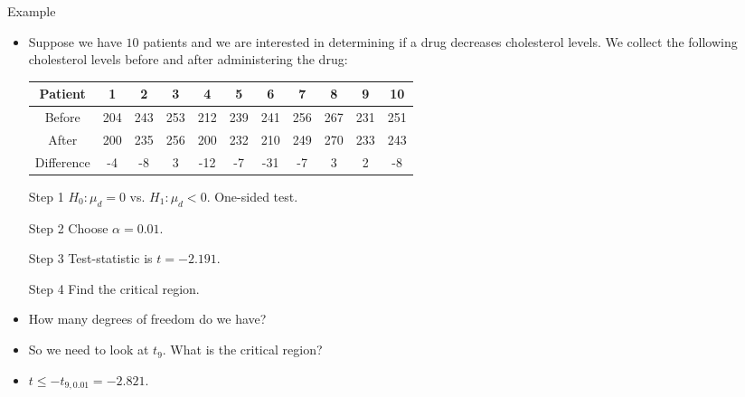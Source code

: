 \documentclass[10pt, handout, xcolor=table]{beamer}
\begin{document}
\begin{frame}{Example}
\begin{itemize}
\setlength{\itemsep}{8pt}
\item Suppose we have $10$ patients and we are interested in determining if a drug decreases cholesterol levels. We collect the following cholesterol levels before and after administering the drug:
{\scriptsize 
\begin{table}[]
\begin{tabular}{|c|c|c|c|c|c|c|c|c|c|c|}
\hline
Patient    & 1   & 2   & 3   & 4   & 5   & 6   & 7   & 8   & 9   & 10  \\ \hline
Before     & 204 & 243 & 253 & 212 & 239 & 241 & 256 & 267 & 231 & 251 \\ \hline
After      & 200 & 235 & 256 & 200 & 232 & 210 & 249 & 270 & 233 & 243 \\ \hline
Difference & -4  & -8  & 3   & -12 & -7  & -31 & -7  & 3   & 2   & -8  \\ \hline
\end{tabular}
\end{table}
}
\item[Step 1] $H_0: \mu_d = 0$ vs. $H_1: \mu_d < 0$. One-sided test.    
\item[Step 2] Choose $\alpha = 0.01$. 
\item[Step 3] Test-statistic is $t = -2.191$.
\item[Step 4] Find the critical region.
\item<2->[] How many degrees of freedom do we have? 
\item<4->[] So we need to look at $t_{9}$. What is the critical region?
\item<5->[] $t \leq -t_{9, 0.01} = -2.821$.
\end{itemize}
\end{frame}
\end{document}
